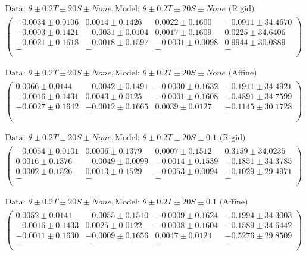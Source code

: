 \begin{align*}
\text{Data: }\theta\pm0.2 T\pm20 S\pm None, \text{Model: }\theta\pm0.2 T\pm20 S\pm None \text{ (Rigid)} \\
\begin{pmatrix}
-0.0034 \pm 0.0106 &  0.0014 \pm 0.1426 &  0.0022 \pm 0.1600 & -0.0911 \pm 34.4670 \\
-0.0003 \pm 0.1421 & -0.0031 \pm 0.0104 &  0.0017 \pm 0.1609 &  0.0225 \pm 34.6406 \\
-0.0021 \pm 0.1618 & -0.0018 \pm 0.1597 & -0.0031 \pm 0.0098 &  0.9944 \pm 30.0889 \\
 - &  - &  - &  - \\
\end{pmatrix}
\end{align*}

\begin{align*}
\text{Data: }\theta\pm0.2 T\pm20 S\pm None, \text{Model: }\theta\pm0.2 T\pm20 S\pm None \text{ (Affine)} \\
\begin{pmatrix}
 0.0066 \pm 0.0144 & -0.0042 \pm 0.1491 & -0.0030 \pm 0.1632 & -0.1911 \pm 34.4921 \\
-0.0016 \pm 0.1431 &  0.0043 \pm 0.0125 & -0.0001 \pm 0.1608 & -0.4891 \pm 34.7599 \\
-0.0027 \pm 0.1642 & -0.0012 \pm 0.1665 &  0.0039 \pm 0.0127 & -0.1145 \pm 30.1728 \\
 - &  - &  - &  - \\
\end{pmatrix}
\end{align*}

\begin{align*}
\text{Data: }\theta\pm0.2 T\pm20 S\pm None, \text{Model: }\theta\pm0.2 T\pm20 S\pm0.1 \text{ (Rigid)} \\
\begin{pmatrix}
-0.0054 \pm 0.0101 &  0.0006 \pm 0.1379 &  0.0007 \pm 0.1512 &  0.3159 \pm 34.0235 \\
 0.0016 \pm 0.1376 & -0.0049 \pm 0.0099 & -0.0014 \pm 0.1539 & -0.1851 \pm 34.3785 \\
 0.0002 \pm 0.1526 &  0.0013 \pm 0.1529 & -0.0053 \pm 0.0094 & -0.1029 \pm 29.4971 \\
 - &  - &  - &  - \\
\end{pmatrix}
\end{align*}

\begin{align*}
\text{Data: }\theta\pm0.2 T\pm20 S\pm None, \text{Model: }\theta\pm0.2 T\pm20 S\pm0.1 \text{ (Affine)} \\
\begin{pmatrix}
 0.0052 \pm 0.0141 & -0.0055 \pm 0.1510 & -0.0009 \pm 0.1624 & -0.1994 \pm 34.3003 \\
-0.0016 \pm 0.1433 &  0.0025 \pm 0.0122 & -0.0008 \pm 0.1604 & -0.1589 \pm 34.6442 \\
-0.0011 \pm 0.1630 & -0.0009 \pm 0.1656 &  0.0047 \pm 0.0124 & -0.5276 \pm 29.8509 \\
 - &  - &  - &  - \\
\end{pmatrix}
\end{align*}


